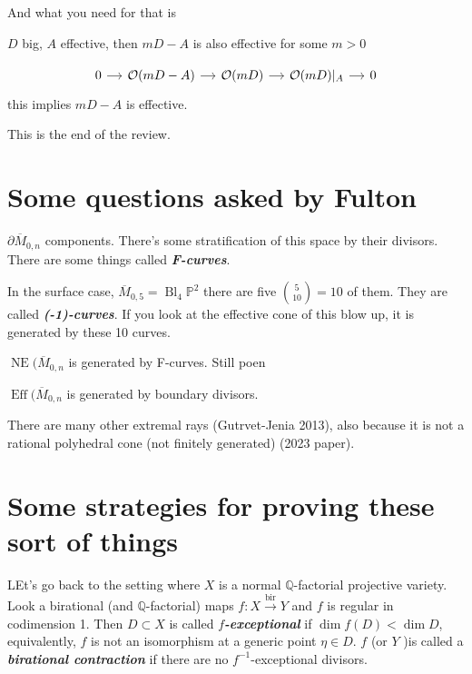And what you need for that is

\begin{lemma}
	$D$ big, $A$ effective, then $mD-A$ is also effective for some  $m>0$

	\[\begin{tikzcd}[column sep=small]
		0\arrow[r]&\mathcal{O}(mD-A)\arrow[r]&\mathcal{O}(mD)\arrow[r]&\mathcal{O}(mD)|_{A}\arrow[r]&0	\end{tikzcd}\]
		this implies $mD-A$ is effective.
\end{lemma}

This is the end of the review.

\section{Some questions asked by Fulton}

$\partial\overline{M}_{0,n}$ components. There's some stratification of this space by their divisors. There are some things called \textit{\textbf{F-curves}}.

 \begin{example}
	 In the surface case, $\overline{M}_{0,5}=\operatorname{Bl}_{4}\mathbb{P}^2$ there are five $\binom{5}{10}=10$ of them. They are called \textit{\textbf{(-1)-curves}}. If you look at the effective cone of this blow up, it is generated by these 10 curves.
\end{example}

\begin{conjecture}
	$\operatorname{NE}(\overline{M}_{0,n}$ is generated by F-curves. Still poen
\end{conjecture}

\begin{conjecture}
$\operatorname{E f f}(\overline{M}_{0,n}$	is generated by boundary divisors.
\end{conjecture}
There are many other extremal rays (Gutrvet-Jenia 2013), also because it is not a rational polyhedral cone (not finitely generated) (2023 paper).

\section{Some strategies for proving these sort of things}

LEt's go back to the setting where $X$ is a normal $\mathbb{Q}$-factorial projective variety. Look a birational (and $\mathbb{Q}$-factorial) maps $f:X\overset{\operatorname{bir}}{\longrightarrow}Y$ and $f$ is regular in codimension 1. Then $D\subset X$ is called \textit{\textbf{$f$-exceptional}}  if $\dim f(D)<\dim D$, equivalently, $f$ is not an isomorphism at a generic point $\eta\in D$. $f$ (or $Y$ )is called a \textit{\textbf{birational contraction}} if there are no  $f^{-1}$-exceptional divisors.


